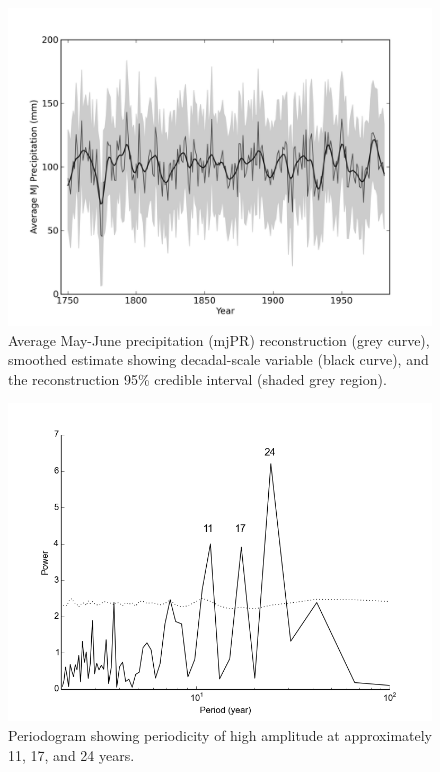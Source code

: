 \begin{figure}
\centering
\includegraphics[width=5in]{figures/recon.png}
\caption{Average May-June precipitation (mjPR) reconstruction (grey curve), smoothed estimate showing decadal-scale variable (black curve), and the reconstruction 95\% credible interval (shaded grey region).}
\label{fig:precipRecon}
\end{figure}

\begin{figure}
\centering
\includegraphics[width=5in]{figures/spectralRecon.png}
\caption{Periodogram showing periodicity of high amplitude at approximately 11, 17, and 24 years.}
\label{fig:spectral}
\end{figure}

